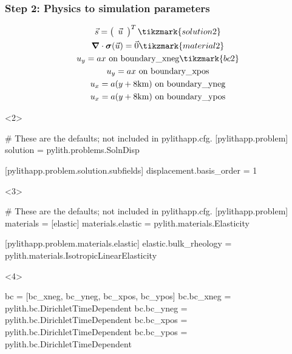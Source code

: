 \documentclass[aspectratio=169]{beamer}
\begin{document}
\begin{frame}[t,fragile]
  \frametitle{Step 2: Physics to simulation parameters}
  \summary{}

  \begin{minipage}[t]{0.35\textwidth}
    {\scriptsize
    \begin{gather*}
      \vec{s} = \left(\begin{array}{c} \vec{u} \end{array}\right)^T \tikzmark{solution2}\\
      \boldsymbol{\nabla} \cdot \boldsymbol{\sigma}(\vec{u}) = \vec{0} \tikzmark{material2}\\
      u_y = ax \text{ on boundary\_xneg} \tikzmark{bc2}\\
      u_y = ax \text{ on boundary\_xpos} \\
      u_x = a(y+8\mathrm{km}) \text{ on boundary\_yneg} \\
      u_x = a(y+8\mathrm{km}) \text{ on boundary\_ypos}
    \end{gather*}}
  \end{minipage}
  \hfill
  \begin{minipage}[t]{0.60\textwidth}
    \begin{onlyenv}<2>
      \begin{cfgcode}
        # These are the defaults; not included in pylithapp.cfg.
        [pylithapp.problem]
        solution = pylith.problems.SolnDisp
        
        [pylithapp.problem.solution.subfields]
        displacement.basis_order = 1
      \end{cfgcode}
    \end{onlyenv}
    \begin{onlyenv}<3>
      \begin{cfgcode}
        # These are the defaults; not included in pylithapp.cfg.
        [pylithapp.problem]
        materials = [elastic]
        materials.elastic = pylith.materials.Elasticity

        [pylithapp.problem.materials.elastic]
        elastic.bulk_rheology = pylith.materials.IsotropicLinearElasticity
      \end{cfgcode}
    \end{onlyenv}
    \begin{onlyenv}<4>
      \begin{cfgcode}
        bc = [bc_xneg, bc_yneg, bc_xpos, bc_ypos]
        bc.bc_xneg = pylith.bc.DirichletTimeDependent
        bc.bc_yneg = pylith.bc.DirichletTimeDependent
        bc.bc_xpos = pylith.bc.DirichletTimeDependent
        bc.bc_ypos = pylith.bc.DirichletTimeDependent
        

\end{cfgcode}
\end{onlyenv}
\end{minipage}
\end{frame}
\end{document}
